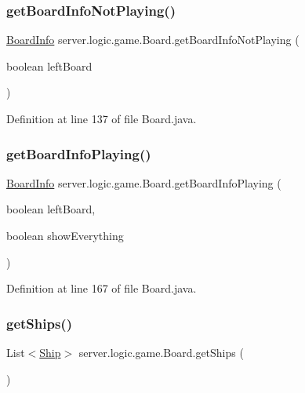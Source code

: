 \subsubsection{\texorpdfstring{get\+Board\+Info\+Not\+Playing()}{getBoardInfoNotPlaying()}}
{\footnotesize\ttfamily \hyperlink{classsharedlib_1_1tuples_1_1_board_info}{Board\+Info} server.\+logic.\+game.\+Board.\+get\+Board\+Info\+Not\+Playing (\begin{DoxyParamCaption}\item[{boolean}]{left\+Board }\end{DoxyParamCaption})}



Definition at line 137 of file Board.\+java.

\hypertarget{classserver_1_1logic_1_1game_1_1_board_abefb8ce9f95462573d3613a4bbda3c99}{}\label{classserver_1_1logic_1_1game_1_1_board_abefb8ce9f95462573d3613a4bbda3c99} 
\subsubsection{\texorpdfstring{get\+Board\+Info\+Playing()}{getBoardInfoPlaying()}}
{\footnotesize\ttfamily \hyperlink{classsharedlib_1_1tuples_1_1_board_info}{Board\+Info} server.\+logic.\+game.\+Board.\+get\+Board\+Info\+Playing (\begin{DoxyParamCaption}\item[{boolean}]{left\+Board,  }\item[{boolean}]{show\+Everything }\end{DoxyParamCaption})}



Definition at line 167 of file Board.\+java.

\hypertarget{classserver_1_1logic_1_1game_1_1_board_adaf9b78ef262a7916d34c5a1817d8915}{}\label{classserver_1_1logic_1_1game_1_1_board_adaf9b78ef262a7916d34c5a1817d8915} 
\subsubsection{\texorpdfstring{get\+Ships()}{getShips()}}
{\footnotesize\ttfamily List$<$\hyperlink{classserver_1_1logic_1_1game_1_1_ship}{Ship}$>$ server.\+logic.\+game.\+Board.\+get\+Ships (\begin{DoxyParamCaption}{ }\end{DoxyParamCaption})}



